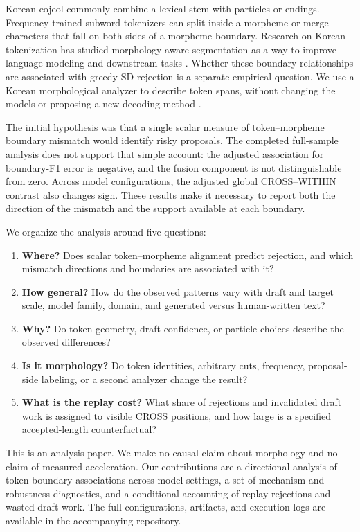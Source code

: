 \documentclass[11pt]{article}
\begin{document}
Korean eojeol commonly combine a lexical stem with particles or endings.
Frequency-trained subword tokenizers can split inside a morpheme or merge
characters that fall on both sides of a morpheme boundary. Research on Korean
tokenization has studied morphology-aware segmentation as a way to improve
language modeling and downstream tasks \citep{park2020korean,lee2026morpheme}.
Whether these boundary relationships are associated with greedy SD rejection
is a separate empirical question. We use a Korean morphological analyzer to
describe token spans, without changing the models or proposing a new decoding
method \citep{lee2024kiwi}.

The initial hypothesis was that a single scalar measure of token--morpheme
boundary mismatch would identify risky proposals. The completed full-sample
analysis does not support that simple account: the adjusted association for
boundary-F1 error is negative, and the fusion component is not distinguishable
from zero. Across model configurations, the adjusted global CROSS--WITHIN
contrast also changes sign. These results make it necessary to report both the
direction of the mismatch and the support available at each boundary.

We organize the analysis around five questions:

\begin{enumerate}
    \item \textbf{Where?} Does scalar token--morpheme alignment predict
    rejection, and which mismatch directions and boundaries are associated
    with it?
    \item \textbf{How general?} How do the observed patterns vary with draft
    and target scale, model family, domain, and generated versus human-written
    text?
    \item \textbf{Why?} Do token geometry, draft confidence, or particle
    choices describe the observed differences?
    \item \textbf{Is it morphology?} Do token identities, arbitrary cuts,
    frequency, proposal-side labeling, or a second analyzer change the result?
    \item \textbf{What is the replay cost?} What share of rejections and
    invalidated draft work is assigned to visible CROSS positions, and how
    large is a specified accepted-length counterfactual?
\end{enumerate}

This is an analysis paper. We make no causal claim about morphology and no
claim of measured acceleration. Our contributions are a directional analysis
of token-boundary associations across model settings, a set of mechanism and
robustness diagnostics, and a conditional accounting of replay rejections and
wasted draft work. The full configurations, artifacts, and execution logs are
available in the accompanying repository.
\end{document}
